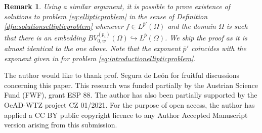 \documentclass[reqno,12pt]{amsart}
\newtheorem{remark}[theorem]{Remark}
\numberwithin{equation}{section}
\begin{document}
\begin{remark}
Using a similar argument, it is possible to prove existence of solutions to problem \eqref{eq:ellipticproblem} in the sense of Definition \ref{dfn:solutionsellipticproblem} whenever $f \in L^{\overline{p}'}(\Omega)$ and the domain $\Omega$ is such that there is an embedding $BV_{0,w}^{(p_i)}(\Omega) \hookrightarrow L^{\overline{p}}(\Omega)$. We skip the proof as it is almost identical to the one above. Note that the exponent $\overline{p}'$ coincides with the exponent given in \cite{MRST} for problem \eqref{eq:introductionellipticproblem}.
\end{remark}


\bigskip


 The author would like to thank prof. Segura de Le\'on for fruitful discussions concerning this paper. This research was funded partially by the Austrian Science Fund (FWF), grant ESP 88. The author has also been partially supported by the OeAD-WTZ project CZ 01/2021. For the purpose of open access, the author has applied a CC BY public copyright licence to any Author Accepted Manuscript version arising from this submission.
\end{document}
